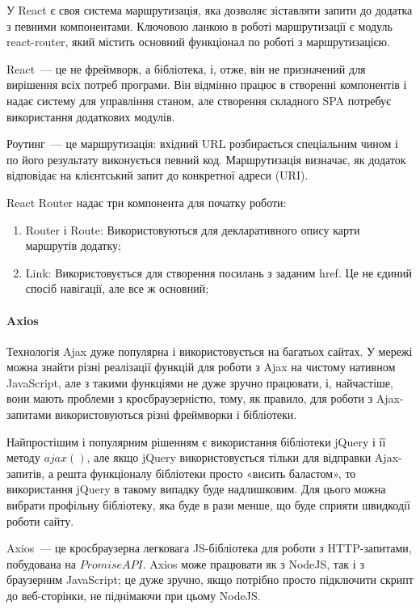 У React є своя система маршрутизація, яка дозволяє зіставляти запити до додатка з певними компонентами. Ключовою ланкою в роботі маршрутизації є модуль react-router, який містить основний функціонал по роботі з маршрутизацією.

React~--- це не фреймворк, а бібліотека, і, отже, він не призначений для вирішення всіх потреб програми. Він відмінно працює в створенні компонентів і надає систему для управління станом, але створення складного SPA потребує використання додаткових модулів.

Роутинг~--- це маршрутизація: вхідний URL розбирається спеціальним чином і по його результату виконується певний код. Маршрутизація визначає, як додаток відповідає на клієнтський запит до конкретної адреси (URI).

React Router надає три компонента для початку роботи:

\begin{enumerate}
    \item Router і Route: Використовуються для декларативного опису карти маршрутів додатку;
    \item Link: Використовується для створення посилань з заданим href. Це не єдиний спосіб навігації, але все ж основний;
\end{enumerate}

\paragraph{Axios}

Технологія Ajax дуже популярна і використовується на багатьох сайтах. У мережі можна знайти різні реалізації функцій для роботи з Ajax на чистому нативном JavaScript, але з такими функціями не дуже зручно працювати, і, найчастіше, вони мають проблеми з кросбраузерністю, тому, як правило, для роботи з Ajax-запитами використовуються різні фреймворки і бібліотеки.

Найпростішим і популярним рішенням є використання бібліотеки jQuery і її методу $ajax()$, але якщо jQuery використовується тільки для відправки Ajax-запитів, а решта функціоналу бібліотеки просто «висить баластом», то використання jQuery в такому випадку буде надлишковим. Для цього можна вибрати профільну бібліотеку, яка буде в рази менше, що буде сприяти швидкодії роботи сайту.

Axios~--- це кросбраузерна легковага JS-бібліотека для роботи з HTTP-запитами, побудована на $Promise API$. Axios може працювати як з NodeJS, так і з браузерним JavaScript; це дуже зручно, якщо потрібно просто підключити скрипт до веб-сторінки, не піднімаючи при цьому NodeJS.
